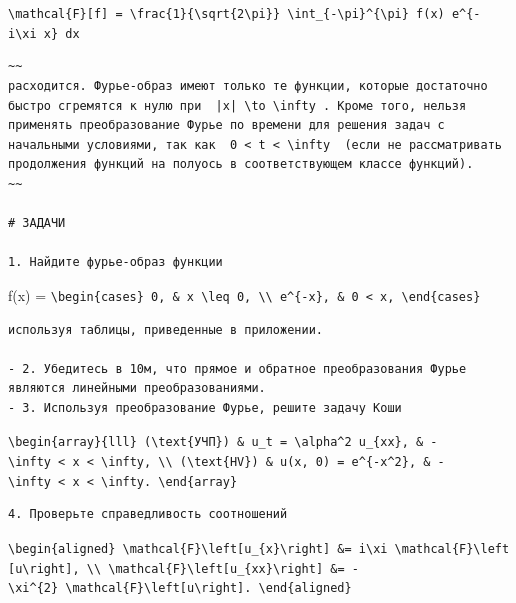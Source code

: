 \documentclass[
  ukrainian,
]{article}
\begin{document}
\texttt{\textbackslash{}mathcal\{F\}{[}f{]}\ =\ \textbackslash{}frac\{1\}\{\textbackslash{}sqrt\{2\textbackslash{}pi\}\}\ \textbackslash{}int\_\{-\textbackslash{}pi\}\^{}\{\textbackslash{}pi\}\ f(x)\ e\^{}\{-i\textbackslash{}xi\ x\}\ dx}

\begin{verbatim}
~~
расходится. Фурье-образ имеют только те функции, которые достаточно быстро сгремятся к нулю при  |x| \to \infty . Кроме того, нельзя применять преобразование Фурье по времени для решения задач с начальными условиями, так как  0 < t < \infty  (если не рассматривать продолжения функций на полуось в соответствующем классе функций).
~~

# ЗАДАЧИ

1. Найдите фурье-образ функции
\end{verbatim}

f(x) =
\texttt{\textbackslash{}begin\{cases\}\ 0,\ \&\ x\ \textbackslash{}leq\ 0,\ \textbackslash{}\textbackslash{}\ e\^{}\{-x\},\ \&\ 0\ \textless{}\ x,\ \textbackslash{}end\{cases\}}

\begin{verbatim}
используя таблицы, приведенные в приложении.

- 2. Убедитесь в 10м, что прямое и обратное преобразования Фурье являются линейными преобразованиями.
- 3. Используя преобразование Фурье, решите задачу Коши
\end{verbatim}

\texttt{\textbackslash{}begin\{array\}\{lll\}\ (\textbackslash{}text\{УЧП\})\ \&\ u\_t\ =\ \textbackslash{}alpha\^{}2\ u\_\{xx\},\ \&\ -\textbackslash{}infty\ \textless{}\ x\ \textless{}\ \textbackslash{}infty,\ \textbackslash{}\textbackslash{}\ (\textbackslash{}text\{HV\})\ \&\ u(x,\ 0)\ =\ e\^{}\{-x\^{}2\},\ \&\ -\textbackslash{}infty\ \textless{}\ x\ \textless{}\ \textbackslash{}infty.\ \textbackslash{}end\{array\}}

\begin{verbatim}
4. Проверьте справедливость соотношений
\end{verbatim}

\texttt{\textbackslash{}begin\{aligned\}\ \textbackslash{}mathcal\{F\}\textbackslash{}left{[}u\_\{x\}\textbackslash{}right{]}\ \&=\ i\textbackslash{}xi\ \textbackslash{}mathcal\{F\}\textbackslash{}left{[}u\textbackslash{}right{]},\ \textbackslash{}\textbackslash{}\ \textbackslash{}mathcal\{F\}\textbackslash{}left{[}u\_\{xx\}\textbackslash{}right{]}\ \&=\ -\textbackslash{}xi\^{}\{2\}\ \textbackslash{}mathcal\{F\}\textbackslash{}left{[}u\textbackslash{}right{]}.\ \textbackslash{}end\{aligned\}}
\end{document}
